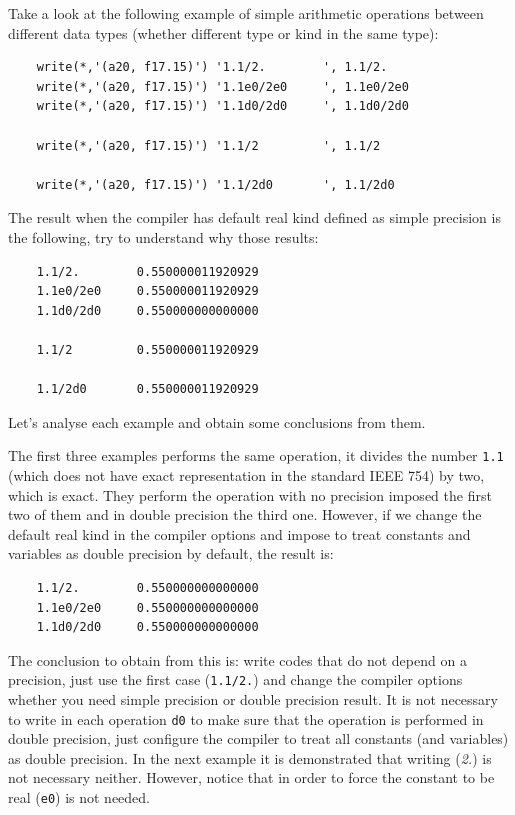 Take a look at the following example of simple arithmetic operations between different data types (whether different type or kind in the same type):

\begin{verbatim} 
    write(*,'(a20, f17.15)') '1.1/2.        ', 1.1/2. 
    write(*,'(a20, f17.15)') '1.1e0/2e0     ', 1.1e0/2e0
    write(*,'(a20, f17.15)') '1.1d0/2d0     ', 1.1d0/2d0 
        
    write(*,'(a20, f17.15)') '1.1/2         ', 1.1/2
    
    write(*,'(a20, f17.15)') '1.1/2d0       ', 1.1/2d0
\end{verbatim}

The result when the compiler has default real kind defined as simple precision is the following, try to understand why those results:

\begin{verbatim}
    1.1/2.        0.550000011920929 
    1.1e0/2e0     0.550000011920929 
    1.1d0/2d0     0.550000000000000 

    1.1/2         0.550000011920929 

    1.1/2d0       0.550000011920929 
\end{verbatim}

Let's analyse each example and obtain some conclusions from them. 

The first three examples performs the same operation, it divides the number \texttt{1.1} (which does not have exact representation in the standard IEEE 754) by two, which is exact. They perform the operation with no precision imposed the first two of them and in double precision the third one. However, if we change the default real kind in the compiler options and impose to treat constants and variables as double precision by default, the result is:

\begin{verbatim}
    1.1/2.        0.550000000000000
    1.1e0/2e0     0.550000000000000
    1.1d0/2d0     0.550000000000000
\end{verbatim}

The conclusion to obtain from this is: write codes that do not depend on a precision, just use the first case (\texttt{1.1/2.}) and change the compiler options whether you need simple precision or double precision result. It is not necessary to write in each operation \texttt{d0} to make sure that the operation is performed in double precision, just configure the compiler to treat all constants (and variables) as double precision. In the next example it is demonstrated that writing (\textit{2.}) is not necessary neither. However, notice that in order to force the constant to be real (\texttt{e0}) is not needed. 

